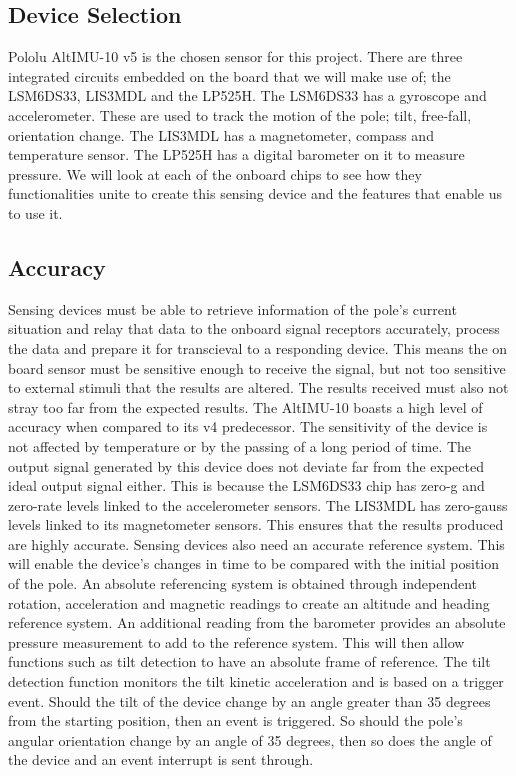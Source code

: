 \documentclass[12pt]{article}
\begin{document}
\subsection{Device Selection}
Pololu AltIMU-10 v5 is the chosen sensor for this project. There are three integrated circuits embedded on the board that we will make use of; the LSM6DS33, LIS3MDL and the LP525H. The LSM6DS33 has a gyroscope and accelerometer. These are used to track the motion of the pole; tilt, free-fall, orientation change. The LIS3MDL has a magnetometer, compass and temperature sensor. The LP525H has a digital barometer on it to measure pressure. We will look at each of the onboard chips to see how they functionalities unite to create this sensing device and the features that enable us to use it. 

\subsection{Accuracy}
Sensing devices must be able to retrieve information of the pole’s current situation and relay that data to the onboard signal receptors accurately, process the data and prepare it for transcieval to a responding device. This means the on board sensor must be sensitive enough to receive the signal, but not too sensitive to external stimuli that the results are altered. The results received must also not stray too far from the expected results. 
The AltIMU-10 boasts a high level of accuracy when compared to its v4 predecessor. The sensitivity of the device is not affected by temperature or by the passing of a long period of time. The output signal generated by this device does not deviate far from the expected ideal output signal either. This is because the LSM6DS33 chip has zero-g and zero-rate levels linked to the accelerometer sensors. The LIS3MDL has zero-gauss levels linked to its magnetometer sensors. This ensures that the results produced are highly accurate. 
Sensing devices also need an accurate reference system. This will enable the device's changes in time to be compared with the initial position of the pole. An absolute referencing system is obtained through independent rotation, acceleration and magnetic readings to create an altitude and heading reference system. An additional reading from the barometer provides an absolute pressure measurement to add to the reference system. This will then allow functions such as tilt detection to have an absolute frame of reference. 
The tilt detection function monitors the tilt kinetic acceleration and is based on a trigger event. Should the tilt of the device change by an angle greater than 35 degrees from the starting position, then an event is triggered. So should the pole’s angular orientation change by an angle of 35 degrees, then so does the angle of the device and an event interrupt is sent through.
\end{document}
